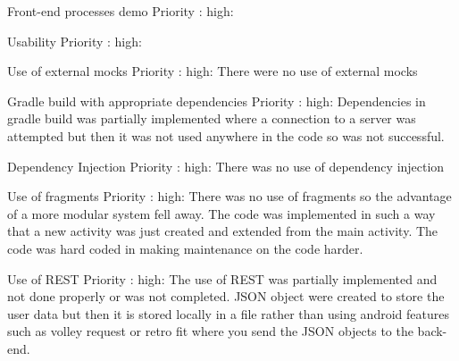 Front-end processes demo
Priority :{ high}: 


Usability
Priority :{ high}: 


Use of external mocks
Priority :{ high}: There were no use of external mocks

Gradle build with appropriate dependencies
Priority :{ high}: Dependencies in gradle build was partially implemented where a connection to a server was attempted but then it was not used anywhere in the code so was not successful.

Dependency Injection
Priority :{ high}: There was no use of dependency injection 

Use of fragments
Priority :{ high}: There was no use of fragments so the advantage of a more modular system fell away. The code was implemented in such a way that a new activity was just created and extended from the main activity. The code was hard coded in making maintenance on the code harder. 

Use of REST
Priority :{ high}: The use of REST was partially implemented and not done properly or was not completed. JSON object were created to store the user data but then it is stored locally in a file rather than using android features such as volley request or retro fit where you send the JSON objects to the back-end.